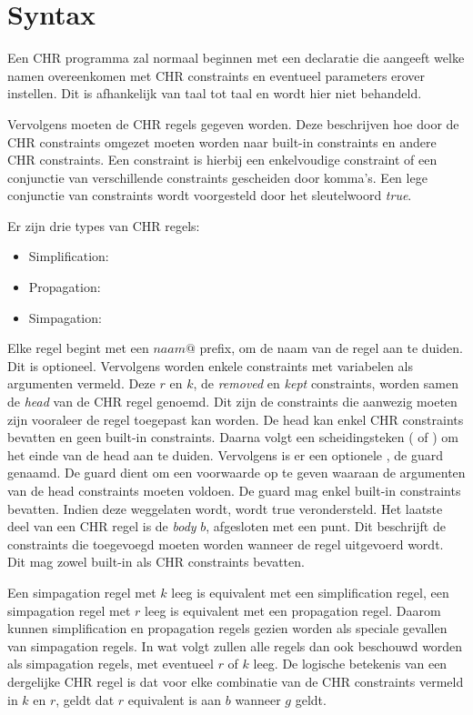 \section{Syntax} \label{sec:chr-syntax}

Een CHR programma zal normaal beginnen met een declaratie die aangeeft welke namen overeenkomen met CHR constraints en eventueel parameters erover instellen. Dit is afhankelijk van taal tot taal en wordt hier niet behandeld.

Vervolgens moeten de CHR regels gegeven worden. Deze beschrijven hoe door de CHR constraints omgezet moeten worden naar built-in constraints en andere CHR constraints. Een constraint is hierbij een enkelvoudige constraint of een conjunctie van verschillende constraints gescheiden door komma's. Een lege conjunctie van constraints wordt voorgesteld door het sleutelwoord {\em true}. 

Er zijn drie types van CHR regels: \begin{itemize}
\item Simplification: 
\item Propagation: 
\item Simpagation: 
\end{itemize}
Elke regel begint met een $ naam @ $ prefix, om de naam van de regel aan te duiden. Dit is optioneel. Vervolgens worden enkele constraints met variabelen als argumenten vermeld. Deze $r$ en $k$, de {\em removed} en {\em kept} constraints, worden samen de {\em head} van de CHR regel genoemd. Dit zijn de constraints die aanwezig moeten zijn vooraleer de regel toegepast kan worden. De head kan enkel CHR constraints bevatten en geen built-in constraints. Daarna volgt een scheidingsteken (\code{<=>} of \code{==>}) om het einde van de head aan te duiden. Vervolgens is er een optionele , de guard genaamd. De guard dient om een voorwaarde op te geven waaraan de argumenten van de head constraints moeten voldoen. De guard mag enkel built-in constraints bevatten. Indien deze weggelaten wordt, wordt true verondersteld. Het laatste deel van een CHR regel is de {\em body} $b$, afgesloten met een punt. Dit beschrijft de constraints die toegevoegd moeten worden wanneer de regel uitgevoerd wordt. Dit mag zowel built-in als CHR constraints bevatten.

Een simpagation regel met $k$ leeg is equivalent met een simplification regel, een simpagation regel met $r$ leeg is equivalent met een propagation regel. Daarom kunnen simplification en propagation regels gezien worden als speciale gevallen van simpagation regels. In wat volgt zullen alle regels dan ook beschouwd worden als simpagation regels, met eventueel $r$ of $k$ leeg. De logische betekenis van een dergelijke CHR regel is dat voor elke combinatie van de CHR constraints vermeld in $k$ en $r$, geldt dat $r$ equivalent is aan $b$ wanneer $g$ geldt.

